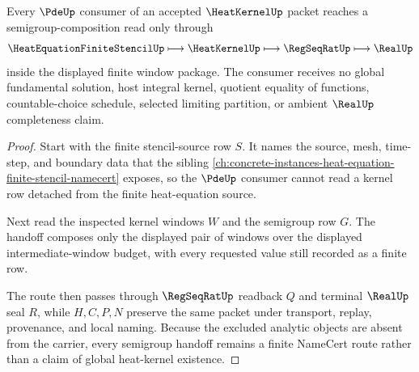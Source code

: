 \begin{theorem}
\label{thm:heat-kernel-semigroup-handoff}
Every $\PdeUp$ consumer of an accepted $\HeatKernelUp$ packet reaches a
semigroup-composition read only through
$$
\HeatEquationFiniteStencilUp \longmapsto \HeatKernelUp
\longmapsto \RegSeqRatUp \longmapsto \RealUp
$$
inside the displayed finite window package. The consumer receives no global
fundamental solution, host integral kernel, quotient equality of functions,
countable-choice schedule, selected limiting partition, or ambient $\RealUp$
completeness claim.
\end{theorem}
\begin{proof}
Start with the finite stencil-source row $S$. It names the source, mesh,
time-step, and boundary data that the sibling
\autoref{ch:concrete-instances-heat-equation-finite-stencil-namecert} exposes,
so the $\PdeUp$ consumer cannot read a kernel row detached from the finite
heat-equation source.

Next read the inspected kernel windows $W$ and the semigroup row $G$. The
handoff composes only the displayed pair of windows over the displayed
intermediate-window budget, with every requested value still recorded as a
finite row.

The route then passes through $\RegSeqRatUp$ readback $Q$ and terminal
$\RealUp$ seal $R$, while $H,C,P,N$ preserve the same packet under transport,
replay, provenance, and local naming. Because the excluded analytic objects
are absent from the carrier, every semigroup handoff remains a finite
NameCert route rather than a claim of global heat-kernel existence.
\end{proof}



